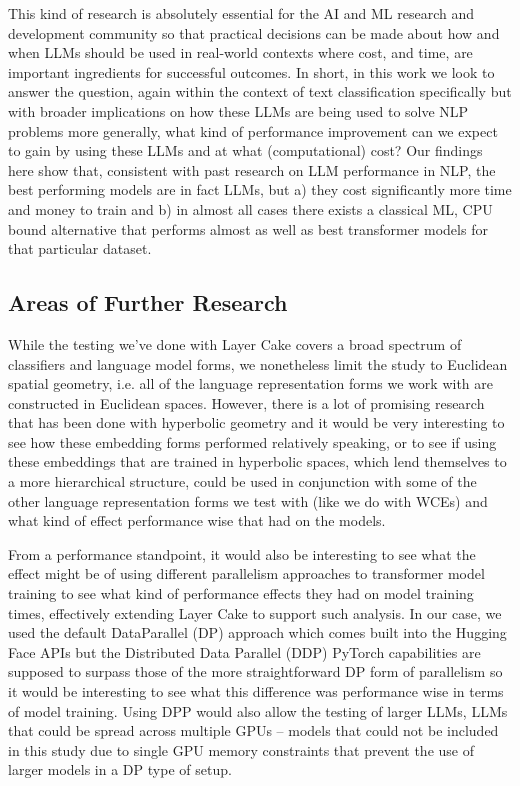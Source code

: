 \documentclass[final]{clv2025}
\begin{document}
This kind of research is absolutely essential for the AI and ML research and development community so that practical decisions can be made about how and when LLMs should be used in real-world contexts where cost, and time, are important ingredients for successful outcomes. In short, in this work we look to answer the question, again within the context of text classification specifically but with broader implications on how these LLMs are being used to solve NLP problems more generally, what kind of performance improvement can we expect to gain by using these LLMs and at what (computational) cost? Our findings here show that, consistent with past research on LLM performance in NLP, the best performing models are in fact LLMs, but a) they cost significantly more time and money to train and b) in almost all cases there exists a classical ML, CPU bound alternative that performs almost as well as best transformer models for that particular dataset. 


\subsection{Areas of Further Research }

While the testing we've done with Layer Cake covers a broad spectrum of classifiers and language model forms, we nonetheless limit the study to Euclidean spatial geometry, i.e. all of the language representation forms we work with are constructed in Euclidean spaces. However, there is a lot of promising research that has been done with hyperbolic geometry \cite{tifrea} \cite{leimeister2019skip} \cite{valentino} and it would be very interesting to see how these embedding forms performed relatively speaking, or to see if using these embeddings that are trained in hyperbolic spaces, which lend themselves to a more hierarchical structure, could be used in conjunction with some of the other language representation forms we test with (like we do with WCEs) and what kind of effect performance wise that had on the models.

From a performance standpoint, it would also be interesting to see what the effect might be of using different parallelism approaches to transformer model training to see what kind of performance effects they had on model training times, effectively extending Layer Cake to support such analysis. In our case, we used the default DataParallel (DP) approach which comes built into the Hugging Face APIs but the Distributed Data Parallel (DDP) PyTorch capabilities are supposed to surpass those of the more straightforward DP form of parallelism so it would be interesting to see what this difference was performance wise in terms of model training. Using DPP would also allow the testing of larger LLMs, LLMs that could be spread across multiple GPUs – models that could not be included in this study due to single GPU memory constraints that prevent the use of larger models in a DP type of setup. 
\end{document}
